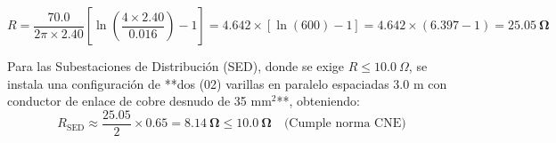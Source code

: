 $$R = \frac{70.0}{2 \pi \times 2.40} \left[ \ln\left( \frac{4 \times 2.40}{0.016} \right) - 1 \right] = 4.642 \times [ \ln(600) - 1 ] = 4.642 \times (6.397 - 1) = \mathbf{25.05\ \Omega}$$

Para las Subestaciones de Distribución (SED), donde se exige $R \le 10.0\ \Omega$, se instala una configuración de **dos (02) varillas en paralelo espaciadas $3.0\text{ m}$ con conductor de enlace de cobre desnudo de 35 mm$^2$**, obteniendo:
$$R_{\text{SED}} \approx \frac{25.05}{2} \times 0.65 = \mathbf{8.14\ \Omega} \le \mathbf{10.0\ \Omega} \quad \text{(Cumple norma CNE)}$$
